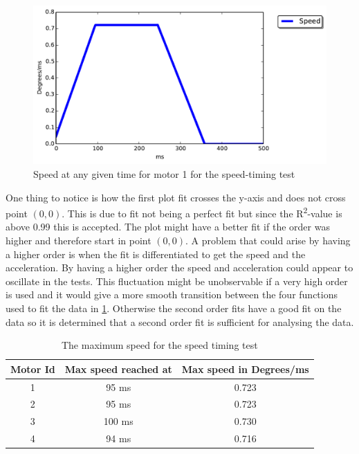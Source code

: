 \begin{figure}[!htb]
    \centering
	\includegraphics[width=1\textwidth]{test_res/speed_tests/Speed_motor1.pdf}
     \caption{Speed at any given time for motor 1 for the speed-timing test}
	\label{fig:speed_1}
\end{figure}

One thing to notice is how the first plot fit crosses the y-axis and does not cross point $(0,0)$. This is due to fit not being a perfect fit but since the R\textsuperscript{2}-value is above 0.99 this is accepted. The plot might have a better fit if the order was higher and therefore start in point $(0,0)$. A problem that could arise by having a higher order is when the fit is differentiated to get the speed and the acceleration. By having a higher order the speed and acceleration could appear to oscillate in the tests. This fluctuation might be unobservable if a very high order is used and it would give a more smooth transition between the four functions used to fit the data in \cref{fig:speed_1}. Otherwise the second order fits have a good fit on the data so it is determined that a second order fit is sufficient for analysing the data.

\begin{table}
  \centering
  \begin{tabular}{| c | c | c |}
    \hline
    Motor Id & Max speed reached at & Max speed in Degrees/ms   \\ \hline
    1 & 95 ms & 0.723 \\ \hline
    2 & 95 ms & 0.723  \\ \hline
    3 & 100 ms & 0.730 \\ \hline
    4 & 94 ms & 0.716   \\ \hline
  \end{tabular}
  \caption{The maximum speed for the speed timing test}
  \label{tbl:max-speed}
\end{table}

